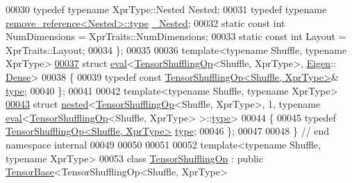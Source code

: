 \begin{DoxyCode}
00030   \textcolor{keyword}{typedef} \textcolor{keyword}{typename} XprType::Nested Nested;
00031   \textcolor{keyword}{typedef} \textcolor{keyword}{typename} \hyperlink{group___sparse_core___module}{remove\_reference<Nested>::type} 
      \hyperlink{group___sparse_core___module}{\_Nested};
00032   \textcolor{keyword}{static} \textcolor{keyword}{const} \textcolor{keywordtype}{int} NumDimensions = XprTraits::NumDimensions;
00033   \textcolor{keyword}{static} \textcolor{keyword}{const} \textcolor{keywordtype}{int} Layout = XprTraits::Layout;
00034 \};
00035 
00036 \textcolor{keyword}{template}<\textcolor{keyword}{typename} Shuffle, \textcolor{keyword}{typename} XprType>
\hyperlink{struct_eigen_1_1internal_1_1eval_3_01_tensor_shuffling_op_3_01_shuffle_00_01_xpr_type_01_4_00_01_eigen_1_1_dense_01_4}{00037} \textcolor{keyword}{struct }\hyperlink{struct_eigen_1_1internal_1_1eval}{eval}<\hyperlink{class_eigen_1_1_tensor_shuffling_op}{TensorShufflingOp}<Shuffle, XprType>, \hyperlink{namespace_eigen}{Eigen}::
      \hyperlink{struct_eigen_1_1_dense}{Dense}>
00038 \{
00039   \textcolor{keyword}{typedef} \textcolor{keyword}{const} \hyperlink{class_eigen_1_1_tensor_shuffling_op}{TensorShufflingOp<Shuffle, XprType>}& 
      \hyperlink{class_eigen_1_1_tensor_shuffling_op}{type};
00040 \};
00041 
00042 \textcolor{keyword}{template}<\textcolor{keyword}{typename} Shuffle, \textcolor{keyword}{typename} XprType>
\hyperlink{struct_eigen_1_1internal_1_1nested_3_01_tensor_shuffling_op_3_01_shuffle_00_01_xpr_type_01_4_00_dada54f27507131254ad9331d623790d}{00043} \textcolor{keyword}{struct }\hyperlink{struct_eigen_1_1internal_1_1nested}{nested}<\hyperlink{class_eigen_1_1_tensor_shuffling_op}{TensorShufflingOp}<Shuffle, XprType>, 1, typename 
      \hyperlink{struct_eigen_1_1internal_1_1eval}{eval}<\hyperlink{class_eigen_1_1_tensor_shuffling_op}{TensorShufflingOp}<Shuffle, XprType> >::\hyperlink{class_eigen_1_1_tensor_shuffling_op}{type}>
00044 \{
00045   \textcolor{keyword}{typedef} \hyperlink{class_eigen_1_1_tensor_shuffling_op}{TensorShufflingOp<Shuffle, XprType>} 
      \hyperlink{class_eigen_1_1_tensor_shuffling_op}{type};
00046 \};
00047 
00048 \}  \textcolor{comment}{// end namespace internal}
00049 
00050 
00051 
00052 \textcolor{keyword}{template}<\textcolor{keyword}{typename} Shuffle, \textcolor{keyword}{typename} XprType>
00053 \textcolor{keyword}{class }\hyperlink{class_eigen_1_1_tensor_shuffling_op}{TensorShufflingOp} : \textcolor{keyword}{public} \hyperlink{class_eigen_1_1_tensor_base}{TensorBase}<TensorShufflingOp<Shuffle, XprType> 

\end{DoxyCode}
